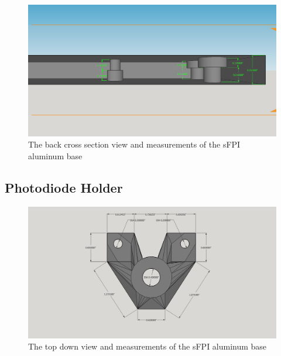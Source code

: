 \documentclass[12pt,journal]{IEEEtran}
\begin{document}
\begin{appendices}
\begin{figure}[h!]
  \centering
	\includegraphics[width=\textwidth]{./mechanical/sfpilensholder_cross_section_2.png}
	\caption[Cavity Mounts]{The back cross section view and measurements of the sFPI aluminum base}
	\label{fig:sfpilensholder-side}
\end{figure}   

\newpage

\subsection{Photodiode Holder} \label{ss:diode_holder}

\begin{figure}[h!]
  \centering
	\includegraphics[width=\textwidth]{./mechanical/diode_holder_top.png}
	\caption[Cavity Mounts]{The top down view and measurements of the sFPI aluminum base}
	\label{fig:diode_holder-top}
\end{figure}  


\end{appendices}
\end{document}
